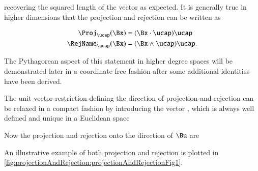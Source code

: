 recovering the squared length of the vector as expected.
It is generally true in higher dimensions that the projection and rejection can be written as

\begin{dmath}\label{eqn:SimpleProducts2:800}
\begin{aligned}
\Proj_\ucap(\Bx) &= (\Bx \cdot \ucap) \ucap \\
\RejName_\ucap(\Bx) &= (\Bx \wedge \ucap) \ucap.
\end{aligned}
\end{dmath}

The Pythagorean aspect of this statement in higher degree spaces
will be demonstrated later in a coordinate free fashion after some additional identities have been derived.

The unit vector restriction defining the direction of projection and rejection can be relaxed in a compact fashion by introducing the vector , which is always well defined and unique in a Euclidean space


Now the projection and rejection onto the direction of \( \Bu \) are


An illustrative example of both projection and rejection is plotted in \cref{fig:projectionAndRejection:projectionAndRejectionFig1}.




